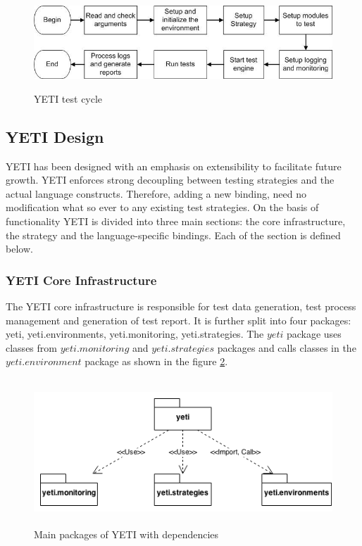 \begin{figure}[h]
	\centering
	\includegraphics[width=14.5cm, height=3.5cm]{chapter3/yetiOverview.png}
	\caption{YETI test cycle}
	\label{fig:yetiOverview}
\end{figure}


\subsection{YETI Design}
YETI has been designed with an emphasis on extensibility to facilitate future growth. YETI enforces strong decoupling between testing strategies and the actual language constructs. Therefore, adding a new binding, need no modification what so ever to any existing test strategies. On the basis of functionality YETI is divided into three main sections: the core infrastructure, the strategy and the language-specific bindings. Each of the section is defined below. 

\subsubsection{YETI Core Infrastructure}
The YETI core infrastructure is responsible for test data generation, test process management and generation of test report. It is further split into four packages: yeti, yeti.environments, yeti.monitoring, yeti.strategies. The $yeti$ package uses classes from $yeti.monitoring$ and $yeti.strategies$ packages and calls classes in the $yeti.environment$ package as shown in the figure \ref{fig:yetiCore}. 

\begin{figure}[h]
	\centering
	\includegraphics[width=14.5cm, height=5.5cm]{chapter3/yetiCore.png}
	\caption{Main packages of YETI with dependencies }
	\label{fig:yetiCore}
\end{figure}


